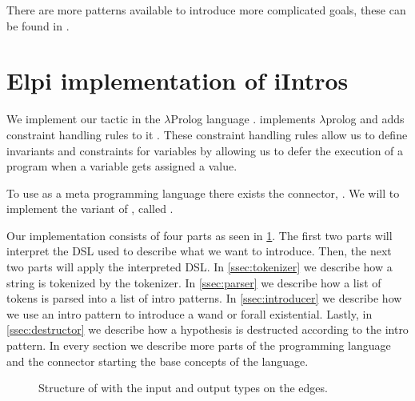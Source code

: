 \documentclass[thesis.tex]{subfiles}
\begin{document}
{{There are more patterns available to introduce more complicated goals, these can be found in \cite*{krebbersInteractiveProofsHigherorder2017}.

\section{Elpi implementation of iIntros}
We implement our tactic in the $\lambda$Prolog language \elpi \cite{dunchevELPIFastEmbeddable2015,guidiImplementingTypeTheory2019}. \elpi implements $\lambda$prolog \cite{millerHigherorderLogicProgramming1986,millerUniformProofsFoundation1991,belleanneePragmaticReconstructionLProlog1999,millerProgrammingHigherOrderLogic2012} and adds constraint handling rules to it \cite{monfroyConstraintHandlingRules2011}. These constraint handling rules allow us to define invariants and constraints for variables by allowing us to defer the execution of a program when a variable gets assigned a value.

To use \elpi as a \coq meta programming language there exists the \elpi \coq connector, \ce \cite{tassiElpiExtensionLanguage2018}. We will \ce to implement the \elpi variant of , called .

Our \elpi implementation  consists of four parts as seen in \cref{fig:eiintrosstruct}. The first two parts will interpret the DSL used to describe what we want to introduce. Then, the next two parts will apply the interpreted DSL. In \cref{ssec:tokenizer} we describe how a string is tokenized by the tokenizer. In \cref{ssec:parser} we describe how a list of tokens is parsed into a list of intro patterns. In \cref{ssec:introducer} we describe how we use an intro pattern to introduce a wand or forall existential. Lastly, in \cref{ssec:destructor} we describe how a hypothesis is destructed according to the intro pattern. In every section we describe more parts of the \elpi programming language and the \ce connector starting the base concepts of the language.
\begin{figure}
  \centering
  \caption{Structure of  with the input and output types on the edges.}
  \label{fig:eiintrosstruct}
\end{figure}

}}
\end{document}

